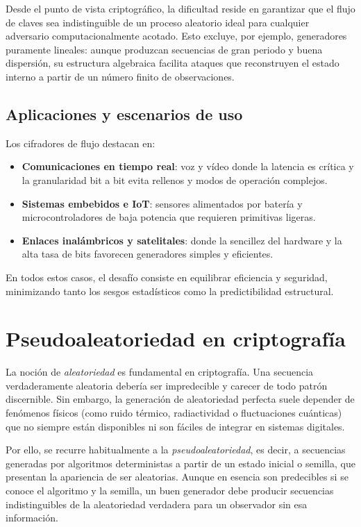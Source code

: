 Desde el punto de vista criptográfico, la dificultad reside en garantizar que el
flujo de claves sea indistinguible de un proceso aleatorio ideal para cualquier
adversario computacionalmente acotado. Esto excluye, por ejemplo, generadores
puramente lineales: aunque produzcan secuencias de gran periodo y buena
dispersión, su estructura algebraica facilita ataques que reconstruyen el estado
interno a partir de un número finito de observaciones.

\subsection*{Aplicaciones y escenarios de uso}

Los cifradores de flujo destacan en:
\begin{itemize}
    \item \textbf{Comunicaciones en tiempo real}: voz y vídeo donde la latencia
    es crítica y la granularidad bit a bit evita rellenos y modos de operación
    complejos.
    \item \textbf{Sistemas embebidos e IoT}: sensores alimentados por batería y
    microcontroladores de baja potencia que requieren primitivas ligeras.
    \item \textbf{Enlaces inalámbricos y satelitales}: donde la sencillez del
    hardware y la alta tasa de bits favorecen generadores simples y eficientes.
\end{itemize}

En todos estos casos, el desafío consiste en equilibrar eficiencia y seguridad,
minimizando tanto los sesgos estadísticos como la predictibilidad estructural.


\section*{Pseudoaleatoriedad en criptografía}

La noción de \textit{aleatoriedad} es fundamental en criptografía. Una
secuencia verdaderamente aleatoria debería ser impredecible y carecer de todo
patrón discernible. Sin embargo, la generación de aleatoriedad perfecta suele
depender de fenómenos físicos (como ruido térmico, radiactividad o fluctuaciones
cuánticas) que no siempre están disponibles ni son fáciles de integrar en
sistemas digitales.

Por ello, se recurre habitualmente a la \textit{pseudoaleatoriedad}, es decir, a
secuencias generadas por algoritmos deterministas a partir de un estado inicial
o semilla, que presentan la apariencia de ser aleatorias. Aunque en esencia son
predecibles si se conoce el algoritmo y la semilla, un buen generador debe
producir secuencias indistinguibles de la aleatoriedad verdadera para un
observador sin esa información.

